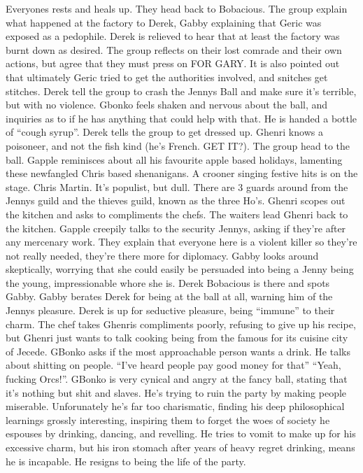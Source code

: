 Everyones rests and heals up. They head back to Bobacious.\medskip
The group explain what happened at the factory to Derek, Gabby explaining that Geric was exposed as a pedophile. Derek is relieved to hear that at least the factory was burnt down as desired.\medskip
The group reflects on their lost comrade and their own actions, but agree that they must press on FOR GARY. It is also pointed out that ultimately Geric tried to get the authorities involved, and snitches get stitches.\medskip
Derek tell the group to crash the Jennys Ball and make sure it’s terrible, but with no violence.\medskip
Gbonko feels shaken and nervous about the ball, and inquiries as to if he has anything that could help with that. He is handed a bottle of “cough syrup”. Derek tells the group to get dressed up.\medskip
Ghenri knows a poisoneer, and not the fish kind (he’s French. GET IT?).\medskip
The group head to the ball.\medskip
Gapple reminisces about all his favourite apple based holidays, lamenting these newfangled Chris based shenanigans.\medskip
A crooner singing festive hits is on the stage. Chris Martin. It’s populist, but dull.\medskip
There are 3 guards around from the Jennys guild and the thieves guild, known as the three Ho’s.\medskip
Ghenri scopes out the kitchen and asks to compliments the chefs. The waiters lead Ghenri back to the kitchen.\medskip
Gapple creepily talks to the security Jennys, asking if they’re after any mercenary work. They explain that everyone here is a violent killer so they’re not really needed, they’re there more for diplomacy.\medskip
Gabby looks around skeptically, worrying that she could easily be persuaded into being a Jenny being the young, impressionable whore she is.\medskip
Derek Bobacious is there and spots Gabby. Gabby berates Derek for being at the ball at all, warning him of the Jennys pleasure. Derek is up for seductive pleasure, being “immune” to their charm.\medskip
The chef takes Ghenris compliments poorly, refusing to give up his recipe, but Ghenri just wants to talk cooking being from the famous for its cuisine city of Jecede.\medskip
GBonko asks if the most approachable person wants a drink. He talks about shitting on people. “I’ve heard people pay good money for that” “Yeah, fucking Orcs!”. GBonko is very cynical and angry at the fancy ball, stating that it’s nothing but shit and slaves. He’s trying to ruin the party by making people miserable. Unforunately he’s far too charismatic, finding his deep philosophical learnings grossly interesting, inspiring them to forget the woes of society he espouses by drinking, dancing, and revelling. He tries to vomit to make up for his excessive charm, but his iron stomach after years of heavy regret drinking, means he is incapable. He resigns to being the life of the party.\medskip
